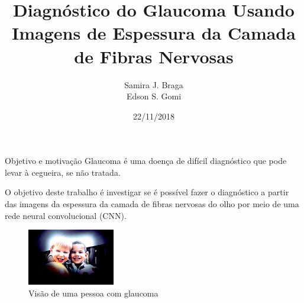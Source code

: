 \documentclass{beamer}
\title{Diagnóstico do Glaucoma Usando Imagens de Espessura da Camada de Fibras Nervosas}
\author{Samira J. Braga \\ Edson S. Gomi}
\institute{Escola Politécnica da Universidade de São Paulo}
\date{22/11/2018}
\begin{document}

\begin{frame}
	\maketitle %
\end{frame}




\begin{frame}{Objetivo e motivação}
    Glaucoma é uma doença de difícil diagnóstico que pode levar à cegueira, se não tratada.
    
    O objetivo deste trabalho é investigar se é possível fazer o diagnóstico a partir das imagens da espessura da camada de fibras nervosas do olho por meio de uma rede neural convolucional (CNN).

    \begin{figure}
        \includegraphics[width=1.5in]{img/glaucomavision.jpg} 
        \caption{Visão de uma pessoa com glaucoma}
    \end{figure}

\end{frame}
\end{document}
